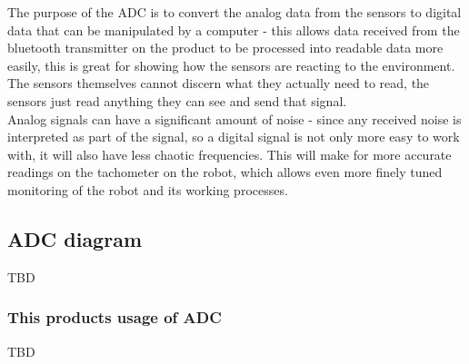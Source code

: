 The purpose of the ADC is to convert the analog data from the sensors to digital data that can be manipulated by a computer - this allows data received from the bluetooth transmitter on the product to be processed into readable data more easily, this is great for showing how the sensors are reacting to the environment. The sensors themselves cannot discern what they actually need to read, the sensors just read anything they can see and send that signal. \\
Analog signals can have a significant amount of noise - since any received noise is interpreted as part of the signal, so a digital signal is not only more easy to work with, it will also have less chaotic frequencies. This will make for more accurate readings on the tachometer on the robot, which allows even more finely tuned monitoring of the robot and its working processes. \\

\subsection{ADC diagram} 
TBD

\subsubsection{This products usage of ADC}

TBD
